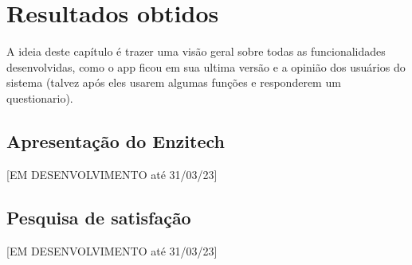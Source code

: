 \chapter{Resultados obtidos}
A ideia deste capítulo é trazer uma visão geral sobre todas as funcionalidades desenvolvidas, como o app ficou em sua ultima versão e a opinião dos usuários do sistema (talvez após eles usarem algumas funções e responderem um questionario). 
\section{Apresentação do Enzitech}
[EM DESENVOLVIMENTO até 31/03/23]

\section{Pesquisa de satisfação}
[EM DESENVOLVIMENTO até 31/03/23]
